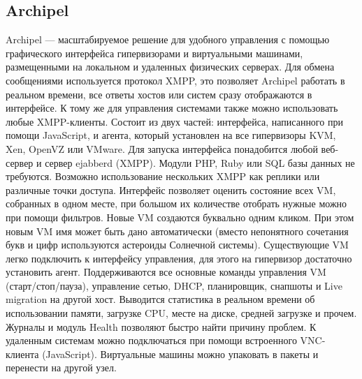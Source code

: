 \subsection{Archipel}
Archipel — масштабируемое решение для удобного управления с помощью графического интерфейса гипервизорами и виртуальными машинами, размещенными на локальном и удаленных физических серверах. Для обмена сообщениями используется протокол XMPP, это позволяет Archipel работать в реальном времени, все ответы хостов или систем сразу отображаются в интерфейсе. К тому же для управления системами также можно использовать любые XMPP-клиенты.
Состоит из двух частей: интерфейса, написанного при помощи JavaScript, и агента, который установлен на все гипервизоры KVM, Xen, OpenVZ или VMware. Для запуска интерфейса понадобится любой веб-сервер и сервер ejabberd (XMPP). Модули PHP, Ruby или SQL базы данных не требуются. Возможно использование нескольких XMPP как реплики или различные точки доступа. Интерфейс позволяет оценить состояние всех VM, собранных в одном месте, при большом их количестве отобрать нужные можно при помощи фильтров. Новые VM создаются буквально одним кликом. При этом новым VM имя может быть дано автоматически (вместо непонятного сочетания букв и цифр используются астероиды Солнечной системы). Существующие VM легко подключить к интерфейсу управления, для этого на гипервизор достаточно установить агент. Поддерживаются все основные команды управления VM (старт/стоп/пауза), управление сетью, DHCP, планировщик, снапшоты и Live migration на другой хост. Выводится статистика в реальном времени об использовании памяти, загрузке CPU, месте на диске, средней загрузке и прочем. Журналы и модуль Health позволяют быстро найти причину проблем. К удаленным системам можно подключаться при помощи встроенного VNC-клиента (JavaScript). Виртуальные машины можно упаковать в пакеты и перенести на другой узел.

